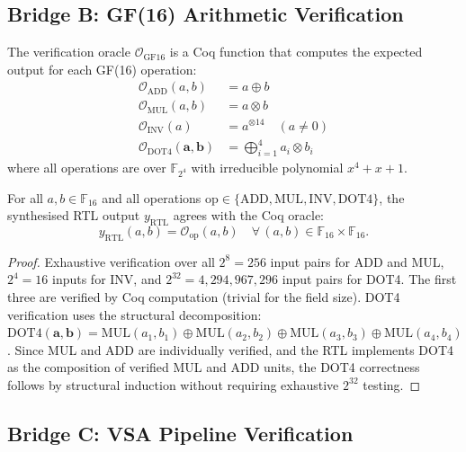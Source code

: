 \subsection{Bridge B: GF(16) Arithmetic Verification}

\begin{definition}
\label{def:hwbridge:verify-oracle}
The verification oracle $\mathcal{O}_{\text{GF16}}$ is a Coq function that
computes the expected output for each GF(16) operation:
\begin{align}
  \mathcal{O}_{\text{ADD}}(a, b) &= a \oplus b \\
  \mathcal{O}_{\text{MUL}}(a, b) &= a \otimes b \\
  \mathcal{O}_{\text{INV}}(a) &= a^{\otimes 14} \quad (a \neq 0) \\
  \mathcal{O}_{\text{DOT4}}(\mathbf{a}, \mathbf{b}) &= \bigoplus_{i=1}^{4} a_i \otimes b_i
\end{align}
where all operations are over $\mathbb{F}_{2^4}$ with irreducible polynomial
$x^4 + x + 1$.
\end{definition}

\begin{theorem}
\label{thm:hwbridge:gf16-correct}
For all $a, b \in \mathbb{F}_{16}$ and all operations $\text{op} \in \{\text{ADD}, \text{MUL}, \text{INV}, \text{DOT4}\}$,
the synthesised RTL output $y_{\text{RTL}}$ agrees with the Coq oracle:
\[
  y_{\text{RTL}}(a, b) = \mathcal{O}_{\text{op}}(a, b)
  \quad \forall\, (a, b) \in \mathbb{F}_{16} \times \mathbb{F}_{16}.
\]
\end{theorem}

\begin{proof}
Exhaustive verification over all $2^8 = 256$ input pairs for ADD and MUL,
$2^4 = 16$ inputs for INV, and $2^{32} = 4{,}294{,}967{,}296$ input pairs
for DOT4. The first three are verified by Coq computation (trivial for the
field size). DOT4 verification uses the structural decomposition:
$\text{DOT4}(\mathbf{a}, \mathbf{b}) = \text{MUL}(a_1, b_1) \oplus
\text{MUL}(a_2, b_2) \oplus \text{MUL}(a_3, b_3) \oplus \text{MUL}(a_4, b_4)$.
Since MUL and ADD are individually verified, and the RTL implements DOT4
as the composition of verified MUL and ADD units, the DOT4 correctness
follows by structural induction without requiring exhaustive $2^{32}$ testing.
\end{proof}

\subsection{Bridge C: VSA Pipeline Verification}

